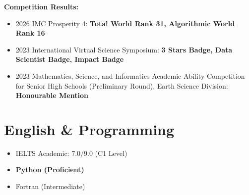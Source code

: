 \documentclass[12pt,a4paper]{article}
\newcommand{\cvsectionsep}{\vspace{2pt}}
\begin{document}
\noindent\textbf{Competition Results:}
\begin{itemize}
    \item 2026 IMC Prosperity 4: \textbf{Total World Rank 31, Algorithmic World Rank 16}
    \item 2023 International Virtual Science Symposium: \textbf{3 Stars Badge, Data Scientist Badge, Impact Badge}
    \item 2023 Mathematics, Science, and Informatics Academic Ability Competition for Senior High Schools
    (Preliminary Round), Earth Science Division: \textbf{Honourable Mention}
\end{itemize}

\cvsectionsep

\section{English \& Programming}
\linespread{0.95}\selectfont
\begin{itemize}
    \item IELTS Academic: 7.0/9.0 (C1 Level)
    \item \textbf{Python (Proficient)}
    \item Fortran (Intermediate)
\end{itemize}

\cvsectionsep
\end{document}

